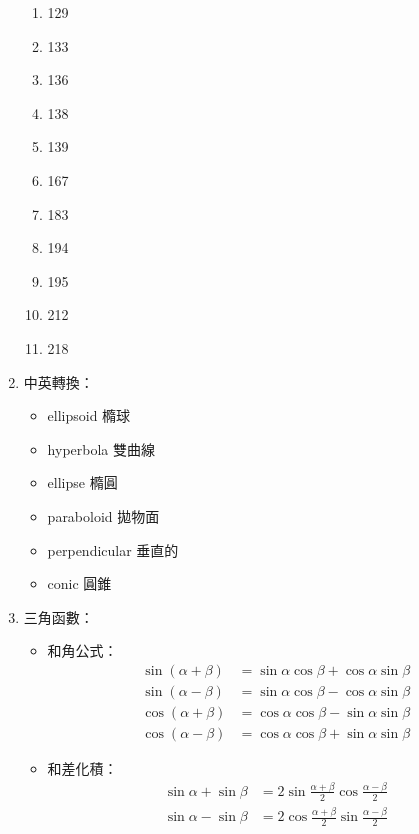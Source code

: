 \begin{enumerate}
\begin{enumerate}
        \item 129
        \item 133
        \item 136
        \item 138
        \item 139
        \item 167
        \item 183
        \item 194
        \item 195
        \item 212
        \item 218
    \end{enumerate}
    \item 中英轉換：
    \begin{itemize}
        \item ellipsoid 橢球
        \item hyperbola 雙曲線
        \item ellipse 橢圓
        \item paraboloid 拋物面
        \item perpendicular 垂直的
        \item conic 圓錐
    \end{itemize}
    \item 三角函數：
    \begin{itemize}
        \item 和角公式： \begin{subequations}
                \begin{align}
                    \sin(\alpha + \beta) & = \sin\alpha\cos\beta + \cos\alpha\sin\beta \\
                    \sin(\alpha - \beta) & = \sin\alpha\cos\beta - \cos\alpha\sin\beta \\
                    \cos(\alpha + \beta) & = \cos\alpha\cos\beta - \sin\alpha\sin\beta \\
                    \cos(\alpha - \beta) & = \cos\alpha\cos\beta + \sin\alpha\sin\beta
                \end{align}
            \end{subequations}
        \item 和差化積： \begin{subequations}
            \begin{align}
                \sin\alpha + \sin\beta & = 2\sin\frac{\alpha + \beta}{2}\cos\frac{\alpha - \beta}{2} \\
                \sin\alpha - \sin\beta & = 2\cos\frac{\alpha + \beta}{2}\sin\frac{\alpha - \beta}{2} \\

\end{align}
\end{subequations}
\end{itemize}
\end{enumerate}
